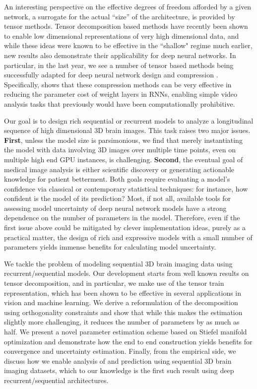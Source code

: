 An interesting perspective on the effective degrees of freedom afforded 
by a given network, a surrogate for the actual ``size'' of the architecture, 
is provided by tensor methods.
Tensor decomposition based methods have recently been shown to enable low dimensional representations of very high dimensional data, 
and while these ideas were known to be effective in the ``shallow" regime much earlier, new results also demonstrate their applicability for deep neural 
networks. 
In particular, in the last year, we see a number of tensor based methods being successfully adapted for deep neural network design and compression \cite{cohen2016expressive,zhang2017tucker,yu2017compressing}.
Specifically, \cite{pmlr-v70-yang17e} shows that these compression methods can be very effective in reducing the parameter cost of weight layers in RNNs, enabling simple video analysis tasks that previously would have been computationally prohibitive.

Our goal is to design rich sequential or recurrent models to analyze a longitudinal sequence of high dimensional 3D brain images. 
This task raises two major issues. {\bf First}, 
unless the model size is parsimonious, we find that merely instantiating the 
model with data involving 3D images over multiple time points, even on multiple high end GPU instances, is challenging.
{\bf Second}, 
the eventual goal of medical image analysis is either scientific discovery or generating 
actionable knowledge for patient betterment. 
Both goals require evaluating a model's confidence via 
classical or contemporary statistical techniques: for instance, how confident is the model of its prediction?  
Most, if not all, available tools for assessing 
model uncertainty of deep neural network models 
have a strong dependence on the number of parameters in 
the model. Therefore, even if the first issue above could be mitigated by clever implementation ideas, purely as a practical 
matter, the design of rich and expressive models with a small number of parameters yields immense benefits for calculating model uncertainty.

We tackle the problem of modeling 
sequential 3D brain imaging data using 
recurrent/sequential models. 
Our development starts from well known results on tensor decomposition, and in particular, we
make use of the tensor train representation, which has been shown to be effective in several 
applications in vision and machine learning. We derive a reformulation of the decomposition using 
orthogonality constraints and show that while this makes the estimation slightly more challenging, 
it reduces the number of parameters by as much as half. 
We present a novel parameter estimation scheme based on Stiefel manifold optimization and demonstrate 
how the end to end construction yields benefits for convergence and uncertainty estimation. 
Finally, from the empirical side, we discuss how we enable analysis of and prediction using sequential 3D brain imaging datasets, which to our knowledge is the first such result using 
deep recurrent/sequential architectures. 
